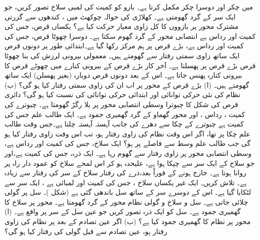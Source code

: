   میں  چکر اور دوسرا   چکر مکمل کرتا ہے۔ بازو کو    کمیت کی 
        لمبی  سلاخ تصور کریں، جو ایک سر کے گرد گھومتی  ہے۔ کھلاڑی کی حوالہ چوکھٹ میں ، کندھوں   سے گزرتی مشترک محور پر بازووں کا  کل زاوی معیار حرکت کیا ہے؟
یکساں قرص، جس کی کمیت  اور رداس  ہے انتصابی محور کے گرد گھوم سکتا ہے۔ دوسرا چھوٹا قرص، جس کی کمیت  اور رداس  ہے، بڑے قرص  پر ہم مرکز   رکھا گیا ہے۔ابتدائی طور پر دونوں قرص ایک ساتھ  زاوی  سمتی رفتار سے گھومتے ہیں۔ معمولی بیرونی لرزش کی بنا چھوٹا قرص بڑے قرص پر  پھسلتا ہے۔ آخر کار بڑے قرص کے بیرونی کنارے میں چھوٹے قرص کا بیرونی کنارہ پھنس جاتا ہے۔ اس کے بعد  دونوں قرص دوبارہ   (بغیر پھسلن) ایک ساتھ گھومتے ہیں۔ (ا)  بڑے قرص کے محور پر اب ان کی  زاوی سمتی  رفتار کیا ہو گی؟ (ب)  نظام کی نئی حرکی توانائی اور ابتدائی حرکی توانائی کی نسبت  کیا ہو گی؟
دائری قرص  کی شکل کا چبوترا وسطی انتصابی محور  پر  بلا رگڑ گھومتا ہے۔ چبوترے کی کمیت  ، رداس  ، اور محور گھماو کے گرد گھمیری جمود  ہے۔ ایک طالب علم جس کی کمیت  ہے چبوترے کے چکا سے دھرے کی جانب آہستہ آہستہ چلتا ہے۔جس وقت طالب علم چکا پر تھا،  اگر  اس وقت نظام کی زاوی رفتار  ہو، تب اس وقت زاوی رفتار کیا ہو گی جب طالب علم  وسط سے  فاصلے پر ہو؟
ایک سلاخ، جس کی کمیت اور  رداس  ہے، وسطی  انتصابی محور پر   زاوی رفتار سے گھوم رہا ہے۔ ایک ذرہ، جس کی کمیت  ہے،اور جو  سلاخ کے ایک سر سے چپکا ہوا ہے، علیحدہ ہو کر اس لمحے سلاخ کو عمود دار راہ پر روانا ہوتا ہے۔ خارج ہونے کے فوراً بعد،ذرے کی رفتار    سلاخ کے سر کی رفتار سے  زیادہ  ہے۔  تلاش کریں۔
ایک غیر یکساں سلاخ  ، جس کی کمیت   اور لمبائی  ہے ، ایک سر سے  لٹکایا گیا ہے۔ اس کے دوسرے سر  کے ساتھ    سل باندھی گئی ہے (شکل )۔  سل پر  گولی چلائی جاتی ہے۔ سل و سلاخ و گولی نظام محور   کے گرد گھومتا ہے۔  محور  پر سلاخ  کا گھمیری جمود  ہے۔ سل کو ایک ذرہ تصور کریں جو عین سل کے سر پر واقع ہے۔ (ا)  محور  پر  نظام کا گھمیری جمود کیا ہے؟  (ب)  اگر عین  تصادم   کے بعد  پر نظام کی زاوی رفتار   ہو، عین  تصادم سے قبل گولی کی رفتار کیا ہو گی؟
